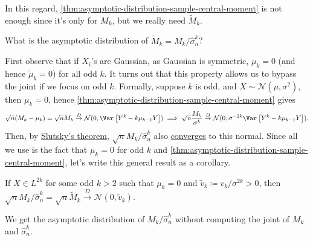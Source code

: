 In this regard, \autoref{thm:asymptotic-distribution-sample-central-moment} is not enough since it's only for \(M_k\), but we really need \(\widetilde{M} _k\).

\begin{problem*}
	What is the asymptotic distribution of \(\widetilde{M} _k = M_k / \hat{\sigma} _n^k \)?
\end{problem*}

First observe that if \(X_i\)'s are Gaussian, as Gaussian is symmetric, \(\mu _k = 0\) (and hence \(\widetilde{\mu} _k = 0\)) for all odd \(k\). It turns out that this property allows us to bypass the joint if we focus on odd \(k\). Formally, suppose \(k\) is odd, and \(X \sim \mathcal{N} (\mu , \sigma ^2)\), then \(\mu _k = 0\), hence \autoref{thm:asymptotic-distribution-sample-central-moment} gives
\[
	\sqrt{n} (M_k - \mu _k) = \sqrt{n} M_k \overset{D}{\to} \mathcal{N} (0, \Var_{}\left[Y^k - k \mu _{k-1} Y\right] )
	\implies \sqrt{n} \frac{M_k}{\sigma ^k} \overset{D}{\to} \mathcal{N} (0, \sigma ^{-2k} \Var_{}\left[Y^k - k \mu _{k-1} Y\right] ).
\]
Then, by \hyperref[col:Slutsky]{Slutsky's theorem}, \(\sqrt{n} M_k / \hat{\sigma} _n^k\) also \hyperref[def:converge-in-distribution]{converges} to this normal. Since all we use is the fact that \(\mu _k = 0\) for odd \(k\) and \autoref{thm:asymptotic-distribution-sample-central-moment}, let's write this general result as a corollary.

\begin{corollary}\label{col:asymptotic-distribution-odd-sample-central-moment}
	If \(X \in L^{2k}\) for some odd \(k>2\) such that \(\mu _k = 0\) and \(\widetilde{v} _k \coloneqq v_k / \sigma ^{2k} > 0\), then \(\sqrt{n} M_k / \hat{\sigma} _n^k = \sqrt{n} \widetilde{M} _k \overset{D}{\to} \mathcal{N} (0, \widetilde{v} _k)\).
\end{corollary}

\begin{remark}
	We get the asymptotic distribution of \(M_k / \hat{\sigma} _n^k\) without computing the joint of \(M_k\) and \(\hat{\sigma} _n^k\).
\end{remark}

